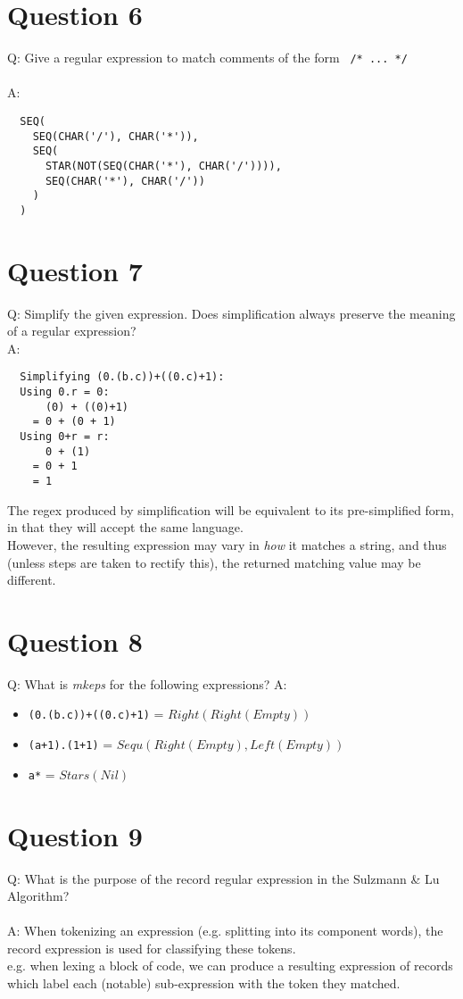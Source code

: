 \documentclass[english]{scrartcl}
\begin{document}
\section*{Question 6}
Q: Give a regular expression to match comments of the form \verb~ /* ... */ ~
\\
\\
A:
\begin{verbatim}
  SEQ(
    SEQ(CHAR('/'), CHAR('*')),
    SEQ(
      STAR(NOT(SEQ(CHAR('*'), CHAR('/')))),
      SEQ(CHAR('*'), CHAR('/'))
    )
  )
\end{verbatim}

\section*{Question 7}
Q: Simplify the given expression. Does simplification always preserve the meaning of a regular expression? \\
\newpage
A:
\begin{verbatim}
  Simplifying (0.(b.c))+((0.c)+1):
  Using 0.r = 0:
      (0) + ((0)+1)
    = 0 + (0 + 1)
  Using 0+r = r:
      0 + (1)
    = 0 + 1
    = 1
\end{verbatim}

The regex produced by simplification will be equivalent to its pre-simplified form, in that they will accept the same language.\\
However, the resulting expression may vary in \textit{how} it matches a string, and thus (unless steps are taken to rectify this), the returned matching value may be different.

\section*{Question 8}
Q: What is \textit{mkeps} for the following expressions?
A:
\begin{itemize}
  \item \verb~(0.(b.c))+((0.c)+1)~ = $Right(Right(Empty))$
  \item \verb~(a+1).(1+1)~ = $Sequ(Right(Empty),Left(Empty))$
  \item \verb~a*~ = $Stars(Nil)$
\end{itemize}

\section*{Question 9}
Q: What is the purpose of the record regular expression in the Sulzmann \& Lu Algorithm? \\
\\
A: When tokenizing an expression (e.g. splitting into its component words), the record expression is used for classifying these tokens. \\
e.g. when lexing a block of code, we can produce a resulting expression of records which label each (notable) sub-expression with the token they matched.
\end{document}
